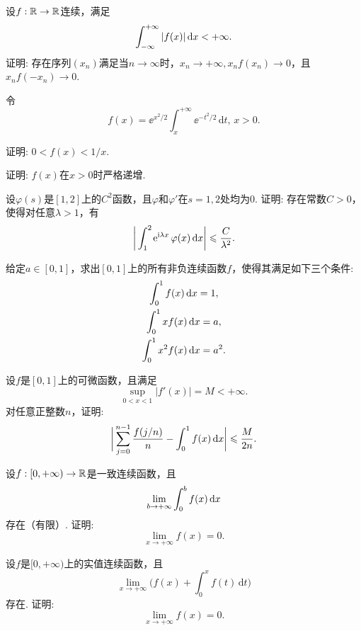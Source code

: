 \begin{example}
  设$f:\mathbb R\to\mathbb R$连续，满足
   \[ \int_{-\infty}^{+\infty}|f(x)|\,\mathrm dx < +\infty. \]
  证明: 存在序列$(x_n)$满足当$n\to\infty$时，$x_n\to+\infty,x_nf(x_n)\to0$，且$x_nf(-x_n)\to0$.
\end{example}

\begin{example}
  令
  \[ f(x)=\ee^{x^2/2}\int_x^{+\infty}\ee^{-t^2/2}\,\mathrm dt,\,x>0. \]
  \begin{eenum}
    \item 证明: $0<f(x)<1/x$.
    \item 证明: $f(x)$在$x>0$时严格递增.
  \end{eenum}
\end{example}

\begin{example}
  设$\varphi(s)$是$[1,2]$上的$C^2$函数，且$\varphi$和$\varphi'$在$s=1,2$处均为0. 证明: 存在常数$C>0$，使得对任意$\lambda>1$，有
  \[ \bigg| \int_1^2\operatorname{\!\!\;\mathrm e}^{\mathrm i\lambda x}\varphi(x)\,\mathrm dx \bigg|
  \leqslant\frac C{\lambda^2}. \]
\end{example}

\begin{example}
  给定$a\in[0,1]$，求出$[0,1]$上的所有非负连续函数$f$，使得其满足如下三个条件:
  \begin{gather*}
    \int_0^1f(x)\,\mathrm dx = 1,\\
    \int_0^1xf(x)\,\mathrm dx = a, \\
    \int_0^1x^2f(x)\,\mathrm dx = a^2.
  \end{gather*}
\end{example}

\begin{example}
  设$f$是$[0,1]$上的可微函数，且满足
    \[ \sup_{0<x<1}|f'(x)| = M < +\infty. \]
  对任意正整数$n$，证明:
  \[
    \bigg| \sum_{j=0}^{n-1}\frac{f(j/n)}n -
    \int_0^1f(x)\,\mathrm dx \bigg| \leqslant \frac M{2n}.
  \]
\end{example}

\begin{example}
  设$f:[0,+\infty)\to\mathbb R$是一致连续函数，且
   \[ \lim_{b\to+\infty}\int_0^bf(x)\,\dx \]
  存在（有限）. 证明:
   \[ \lim_{x\to+\infty}f(x)=0. \]
\end{example}

\begin{example}
  设$f$是$[0,+\infty)$上的实值连续函数，且
  \[ \lim_{x\to+\infty}\bigg( f(x)+\int_0^xf(t)\,\mathrm dt \bigg) \]
  存在. 证明:
  \[ \lim_{x\to+\infty}f(x) = 0. \]
\end{example}

